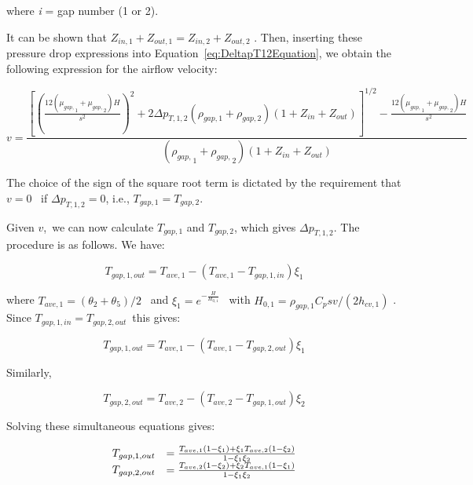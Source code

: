 where \emph{i} = gap number (1 or 2).

It can be shown that \({Z_{in,1}} + {Z_{out,1}} = {Z_{in,2}} + {Z_{out,2}}\) . Then, inserting these pressure drop expressions into Equation~\ref{eq:DeltapT12Equation}, we obtain the following expression for the airflow velocity:

\begin{equation}
v = \frac{{{{\left[ {{{\left( {\frac{{12({\mu_{gap,}}_1 + {\mu_{gap,}}_2)H}}{{{s^2}}}} \right)}^2} + 2\Delta {p_{T,1,2}}({\rho_{gap,1}} + {\rho_{gap,2}})(1 + {Z_{in}} + {Z_{out}})} \right]}^{1/2}} - \frac{{12({\mu_{gap,}}_1 + {\mu_{gap,}}_2)H}}{{{s^2}}}}}{{({\rho_{gap,}}_1 + {\rho_{gap,}}_2)(1 + {Z_{in}} + {Z_{out}})}}
\label{eq:AirFlowVelocityEquation}
\end{equation}

The choice of the sign of the square root term is dictated by the requirement that \(v = 0\) ~if \(\Delta {p_{T,1,2}} = 0\), i.e., \({T_{gap,1}} = {T_{gap,2}}\).

Given \(v\),~we can now calculate \({T_{gap,1}}\) and \({T_{gap,2}}\), which gives \(\Delta {p_{T,1,2}}\). The procedure is as follows. We have:

\begin{equation}
{T_{gap,1,out}} = {T_{ave,1}} - ({T_{ave,1}} - {T_{gap,1,in}}){\xi_1}
\end{equation}

where \({T_{ave,1}} = ({\theta_2} + {\theta_5})/2\) ~and \({\xi_1} = {e^{ - \frac{H}{{{H_{0,1}}}}}}\) ~with \({H_{0,1}} = {\rho_{gap,1}}{C_p}sv/(2{h_{cv,1}})\) . Since \({T_{gap,1,in}} = {T_{gap,2,out}}\)~this gives:

\begin{equation}
{T_{gap,1,out}} = {T_{ave,1}} - ({T_{ave,1}} - {T_{gap,2,out}}){\xi_1}
\end{equation}

Similarly,

\begin{equation}
{T_{gap,2,out}} = {T_{ave,2}} - ({T_{ave,2}} - {T_{gap,1,out}}){\xi_2}
\end{equation}

Solving these simultaneous equations gives:

\begin{equation}
  \begin{array}{rl}
    T_{gap,1,out} &= \frac{T_{ave,1}\left(1 - \xi_1\right) + \xi_1 T_{ave,2}\left(1 - \xi_2\right)}{1 - \xi_1 \xi_2} \\
    T_{gap,2,out} &= \frac{T_{ave,2}\left(1 - \xi_2\right) + \xi_2 T_{ave,1}\left(1 - \xi_1\right)}{1 - \xi_1 \xi_2}
  \end{array}
\end{equation}

